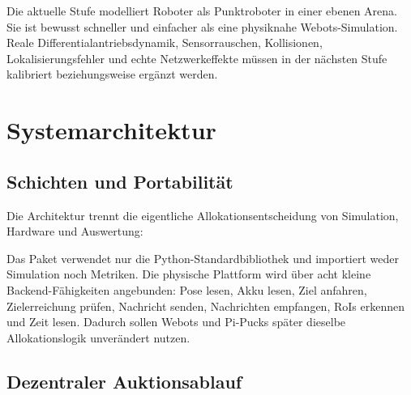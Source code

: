 \documentclass[11pt,a4paper]{article}
\newcommand{\codepath}[1]{\texttt{\detokenize{#1}}}
\begin{document}
Die aktuelle Stufe modelliert Roboter als Punktroboter in einer ebenen Arena. Sie ist
bewusst schneller und einfacher als eine physiknahe Webots-Simulation. Reale
Differentialantriebsdynamik, Sensorrauschen, Kollisionen, Lokalisierungsfehler und echte
Netzwerkeffekte müssen in der nächsten Stufe kalibriert beziehungsweise ergänzt werden.

\section{Systemarchitektur}

\subsection{Schichten und Portabilität}

Die Architektur trennt die eigentliche Allokationsentscheidung von Simulation,
Hardware und Auswertung:

\begin{center}
\setlength{\fboxsep}{8pt}
\end{center}

Das Paket \codepath{allocation/} verwendet nur die Python-Standardbibliothek und
importiert weder Simulation noch Metriken. Die physische Plattform wird über acht kleine
Backend-Fähigkeiten angebunden: Pose lesen, Akku lesen, Ziel anfahren, Zielerreichung
prüfen, Nachricht senden, Nachrichten empfangen, RoIs erkennen und Zeit lesen. Dadurch
sollen Webots und Pi-Pucks später dieselbe Allokationslogik unverändert nutzen.

\subsection{Dezentraler Auktionsablauf}
\end{document}
